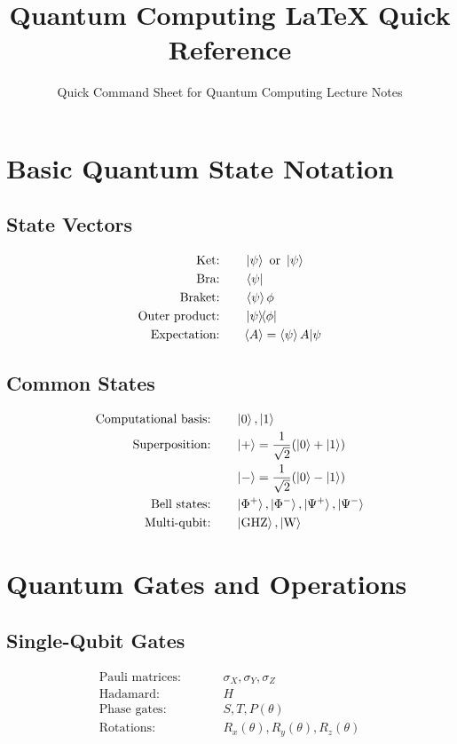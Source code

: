 \documentclass[12pt]{article}
\title{\textbf{\Large Quantum Computing LaTeX Quick Reference}}
\author{Quick Command Sheet for Quantum Computing Lecture Notes}
\date{}
\newcommand{\expectation}[1]{\langle#1\rangle}
\newcommand{\qzero}{\ket{0}}
\newcommand{\qone}{\ket{1}}
\newcommand{\qplus}{\ket{+}}
\newcommand{\qminus}{\ket{-}}
\newcommand{\qpsi}{\ket{\psi}}
\newcommand{\bellphi}{\ket{\Phi^+}}
\newcommand{\bellphim}{\ket{\Phi^-}}
\newcommand{\bellpsi}{\ket{\Psi^+}}
\newcommand{\bellpsim}{\ket{\Psi^-}}
\newcommand{\GHZ}{\ket{\text{GHZ}}}
\newcommand{\Wstate}{\ket{\text{W}}}
\newcommand{\pauliX}{\sigma_X}
\newcommand{\pauliY}{\sigma_Y}
\newcommand{\pauliZ}{\sigma_Z}
\newcommand{\hadamard}{H}
\newcommand{\rx}[1]{R_x(#1)}
\newcommand{\ry}[1]{R_y(#1)}
\newcommand{\rz}[1]{R_z(#1)}
\newcommand{\phaseS}{S}
\newcommand{\phaseT}{T}
\newcommand{\phaseP}[1]{P(#1)}
\theoremstyle{definition}
\theoremstyle{remark}
\begin{document}
\maketitle
\thispagestyle{fancy}

\begin{multicols}{2}

\section{Basic Quantum State Notation}

\subsection{State Vectors}
\begin{alignat}{2}
\text{Ket:}          &\quad && \ket{\psi} \text{ or } \qpsi \\
\text{Bra:}          &\quad && \bra{\psi} \\
\text{Braket:}       &\quad && \braket{\psi}{\phi} \\
\text{Outer product:}&\quad && \ketbra{\psi}{\phi} \\
\text{Expectation:}  &\quad && \expectation{A} = \braket{\psi}{A|\psi}
\end{alignat}

\subsection{Common States}
\begin{alignat}{2}
\text{Computational basis:} &\quad && \qzero, \qone \\
\text{Superposition:}       &\quad && \qplus = \frac{1}{\sqrt{2}}(\qzero + \qone) \\
                             &\quad && \qminus = \frac{1}{\sqrt{2}}(\qzero - \qone) \\
\text{Bell states:}         &\quad && \bellphi, \bellphim, \bellpsi, \bellpsim \\
\text{Multi-qubit:}         &\quad && \GHZ, \Wstate
\end{alignat}


\section{Quantum Gates and Operations}

\subsection{Single-Qubit Gates}
\begin{alignat}{2}
\text{Pauli matrices:} &\quad && \pauliX, \pauliY, \pauliZ \\
\text{Hadamard:}       &\quad && \hadamard \\
\text{Phase gates:}    &\quad && \phaseS, \phaseT, \phaseP{\theta} \\
\text{Rotations:}      &\quad && \rx{\theta}, \ry{\theta}, \rz{\theta}
\end{alignat}


\end{multicols}
\end{document}
